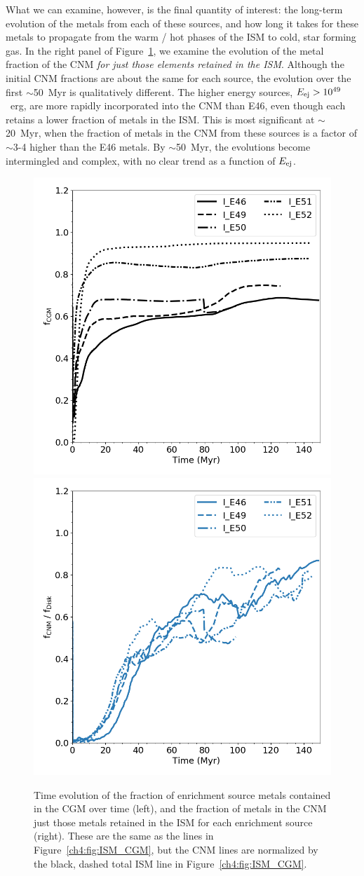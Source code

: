 What we can examine, however, is the final quantity of interest: the long-term evolution of the metals from each of these sources, and how long it takes for these metals to propagate from the warm / hot phases of the ISM to cold, star forming gas. In the right panel of Figure~\ref{ch4:fig:CGM_CNM}, we examine the evolution of the metal fraction of the CNM \textit{for just those elements retained in the ISM}. Although the initial CNM fractions are about the same for each source, the evolution over the first $\sim$50~Myr is qualitatively different. The higher energy sources, $E_{\rm ej} > 10^{49}$~erg, are more rapidly incorporated into the CNM than E46, even though each retains a lower fraction of metals in the ISM. This is most significant at $\sim$20~Myr, when the fraction of metals in the CNM from these sources is a factor of $\sim$3-4 higher than the E46 metals. By $\sim$50~Myr, the evolutions become intermingled and complex, with no clear trend as a function of $E_{\rm ej}$.

\begin{figure}
  \centering
  \includegraphics[width=0.45\linewidth]{figures/ch4/CGM_average_evolution}
  \includegraphics[width=0.45\linewidth]{figures/ch4/CNM_average_evolution}
  \caption{Time evolution of the fraction of enrichment source metals contained in the CGM over time (left), and the fraction of metals in the CNM just those metals retained in the ISM for each enrichment source (right). These are the same as the lines in Figure~\ref{ch4:fig:ISM_CGM}, but the CNM lines are normalized by the black, dashed total ISM line in Figure~\ref{ch4:fig:ISM_CGM}.}
  \label{ch4:fig:CGM_CNM}
\end{figure}

